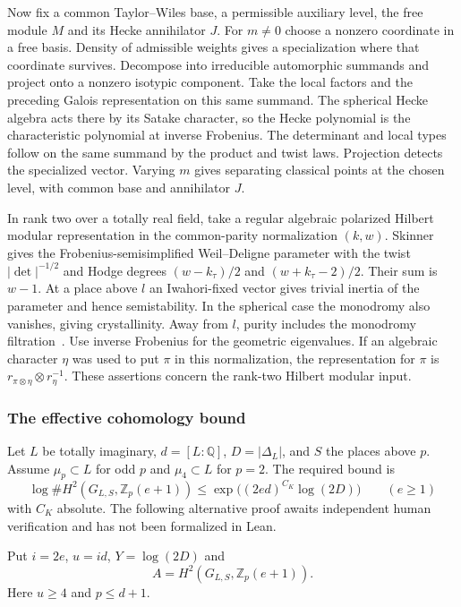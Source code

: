 Now fix a common Taylor--Wiles base, a permissible auxiliary level, the free module $M$ and its Hecke annihilator $J$. For $m\ne0$ choose a nonzero coordinate in a free basis. Density of admissible weights gives a specialization where that coordinate survives. Decompose into irreducible automorphic summands and project onto a nonzero isotypic component. Take the local factors and the preceding Galois representation on this same summand. The spherical Hecke algebra acts there by its Satake character, so the Hecke polynomial is the characteristic polynomial at inverse Frobenius. The determinant and local types follow on the same summand by the product and twist laws. Projection detects the specialized vector. Varying $m$ gives separating classical points at the chosen level, with common base and annihilator $J$.

In rank two over a totally real field, take a regular algebraic polarized
Hilbert modular representation in the common-parity normalization $(k,w)$.
Skinner~\cite[eq.~(1), Thm.~1]{skinner09} gives the Frobenius-semisimplified
Weil--Deligne parameter with the twist $|\det|^{-1/2}$ and Hodge degrees
$(w-k_\tau)/2$ and $(w+k_\tau-2)/2$. Their sum is $w-1$.
At a place above $l$ an Iwahori-fixed vector gives trivial inertia of the
parameter and hence semistability. In the spherical case the monodromy
also vanishes, giving crystallinity. Away from $l$, purity includes the
monodromy filtration~\cite[Cor.~7]{blasius}. Use inverse Frobenius for the
geometric eigenvalues. If an algebraic character $\eta$ was used to put
$\pi$ in this normalization, the representation for $\pi$ is
$r_{\pi\otimes\eta}\otimes r_\eta^{-1}$. These assertions concern the
rank-two Hilbert modular input.

\subsubsection{The effective cohomology bound}\label{tw:effectiveK}

Let $L$ be totally imaginary, $d=[L:\mathbb Q]$, $D=|\Delta_L|$, and $S$ the places above $p$. Assume $\mu_p\subset L$ for odd $p$ and $\mu_4\subset L$ for $p=2$. The required bound is
\[
 \log\#H^2(G_{L,S},\mathbb Z_p(e+1))
       \le \exp\big((2ed)^{C_K}\log(2D)\big)
 \qquad(e\ge1)
\]
with $C_K$ absolute. The following alternative proof awaits independent human verification and has not been formalized in Lean.

Put $i=2e$, $u=id$, $Y=\log(2D)$ and
\[ A=H^2(G_{L,S},\mathbb Z_p(e+1)). \]
Here $u\ge4$ and $p\le d+1$.

